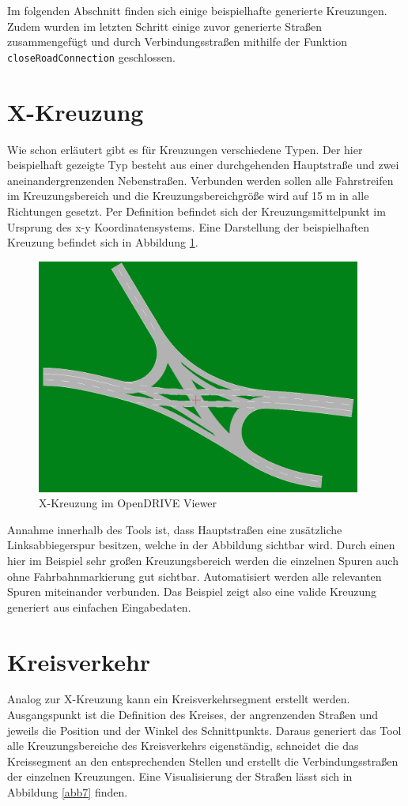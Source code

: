 Im folgenden Abschnitt finden sich einige beispielhafte generierte Kreuzungen. Zudem wurden im letzten Schritt einige zuvor generierte Straßen zusammengefügt und durch Verbindungsstraßen mithilfe der Funktion \texttt{closeRoadConnection} geschlossen.

\section{X-Kreuzung}
Wie schon erläutert gibt es für Kreuzungen verschiedene Typen. Der hier beispielhaft gezeigte Typ besteht aus einer durchgehenden Hauptstraße und zwei aneinandergrenzenden Nebenstraßen. Verbunden werden sollen alle Fahrstreifen im Kreuzungsbereich und die Kreuzungsbereichgröße wird auf 15 m in alle Richtungen gesetzt. Per Definition befindet sich der Kreuzungsmittelpunkt im Ursprung des x-y Koordinatensystems. Eine Darstellung der beispielhaften Kreuzung befindet sich in Abbildung \ref{abb6}.

\begin{figure}[H]
\flushleft
\includegraphics[width=0.95\textwidth]{fig/fig6.png}
\caption{X-Kreuzung im OpenDRIVE Viewer}
\label{abb6}
\end{figure}

Annahme innerhalb des Tools ist, dass Hauptstraßen eine zusätzliche Linksabbiegerspur besitzen, welche in der Abbildung sichtbar wird. Durch einen hier im Beispiel sehr großen Kreuzungsbereich werden die einzelnen Spuren auch ohne Fahrbahnmarkierung gut sichtbar. Automatisiert werden alle relevanten Spuren miteinander verbunden. Das Beispiel zeigt also eine valide Kreuzung generiert aus einfachen Eingabedaten.

\section{Kreisverkehr}
Analog zur X-Kreuzung kann ein Kreisverkehrsegment erstellt werden. Ausgangspunkt ist die Definition des Kreises, der angrenzenden Straßen und jeweils die Position und der Winkel des Schnittpunkts. Daraus generiert das Tool alle Kreuzungsbereiche des Kreisverkehrs eigenständig, schneidet die das Kreissegment an den entsprechenden Stellen und erstellt die Verbindungsstraßen der einzelnen Kreuzungen. Eine Visualisierung der Straßen lässt sich in Abbildung \ref{abb7} finden.

